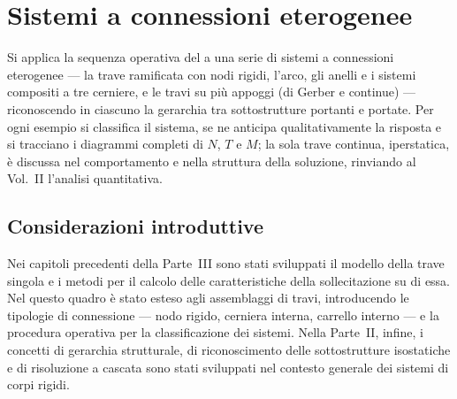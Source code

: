 \graphicspath{{Parti/P04-Travi_rigide/C04_Sistemi_connessioni_eterogenee/Figure/}}
\chapter{Sistemi a connessioni eterogenee}
\label{cap:sistemi_conn_eterogenee}


\begin{sommario}
	Si applica la sequenza operativa del 
	a una serie di sistemi a connessioni eterogenee --- la trave
	ramificata con nodi rigidi, l'arco, gli anelli e i sistemi
	compositi a tre cerniere, e le travi su più appoggi (di Gerber
	e continue) --- riconoscendo in ciascuno la gerarchia tra
	sottostrutture portanti e portate. Per ogni esempio si classifica
	il sistema, se ne anticipa qualitativamente la risposta e si
	tracciano i diagrammi completi di $N$, $T$ e $M$; la sola trave
	continua, iperstatica, è discussa nel comportamento e nella
	struttura della soluzione, rinviando al Vol.~II l'analisi
	quantitativa.
\end{sommario}

\section*{Considerazioni introduttive}
\label{sec:raccordo_eterogenei}

Nei capitoli precedenti della Parte~III sono stati
sviluppati il modello della trave singola e i metodi
per il calcolo delle caratteristiche della sollecitazione
su di essa. Nel  questo
quadro è stato esteso agli assemblaggi di travi,
introducendo le tipologie di connessione --- nodo rigido,
cerniera interna, carrello interno --- e la procedura
operativa per la classificazione dei sistemi. Nella
Parte~II, infine, i concetti di gerarchia strutturale,
di riconoscimento delle sottostrutture isostatiche e di
risoluzione a cascata sono stati sviluppati nel contesto
generale dei sistemi di corpi rigidi.

